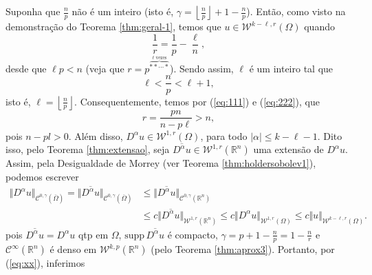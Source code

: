 \documentclass[a4paper, 11pt]{book}
\theoremstyle{definition}
\newcommand{\bR}{\mathbb{R}}
\newcommand{\cC}{\mathcal{C}}
\newcommand{\cW}{\mathcal{W}}
\newcommand{\supp}{\mathrm{supp}\,}
\begin{document}
\begin{prf}
    Suponha que $\frac{n}{p}$ não é um inteiro (isto é, $\gamma = \left\lfloor \frac{n}{p} \right\rfloor + 1 - \frac{n}{p}$). Então, como visto na demonstração do Teorema \ref{thm:geral-1}, temos que $u \in \cW^{k-\ell,r}(\Omega)$ quando
    \begin{equation} \label{eq:111}
        \frac{1}{r} = \frac{1}{p} - \frac{\ell}{n},
    \end{equation}
    desde que $\ell p < n$ (veja que $r = p^{\overbrace{**\cdots*}^{\ell \text{ vezes}}}$). Sendo assim, $\ell$ é um inteiro tal que
    \begin{equation} \label{eq:222}
        \ell < \frac{n}{p} < \ell + 1,
    \end{equation}
    isto é, $\ell = \left\lfloor \frac{n}{p} \right\rfloor$.
    Consequentemente, temos por (\ref{eq:111}) e (\ref{eq:222}), que
    \begin{equation}
        r = \frac{pn}{n-p\ell} > n,
    \end{equation}
    pois $n - pl > 0$. Além disso, $D^\alpha u \in \cW^{1,r}(\Omega)$, para todo $|\alpha| \leqslant k - \ell -1$. Dito isso, pelo Teorema \ref{thm:extensao}, seja $\overline{D^\alpha u} \in \cW^{1,r}(\bR^n)$ uma extensão de $D^\alpha u$.
    Assim, pela Desigualdade de Morrey (ver Teorema \ref{thm:holdersobolev1}), podemos escrever
    \begin{equation} \label{eq:xx}
        \begin{aligned}
            \Vert D^\alpha u \Vert_{\cC^{0,\gamma}(\overline\Omega)} = \Vert \overline{D^\alpha u} \Vert_{\cC^{0,\gamma}(\overline\Omega)} &\leqslant \Vert \overline{D^\alpha u} \Vert_{\cC^{0,\gamma}(\bR^n)} \\
            &\leqslant c \Vert \overline{D^\alpha u} \Vert_{\cW^{1,r}(\bR^n)}\leqslant c \Vert D^\alpha u \Vert_{\cW^{1,r}(\Omega)} \leqslant c \Vert u \Vert_{\cW^{k-\ell,r}(\Omega)}.
        \end{aligned}
    \end{equation}
    pois $\overline{D^\alpha u} = D^\alpha u$ qtp em $\Omega$, $\supp \overline{D^\alpha u}$ é compacto, $\gamma = p + 1 - \frac{n}{p} = 1 - \frac{n}{r}$ e $\cC^\infty(\bR^n)$ é denso em $\cW^{k,p}(\bR^n)$ (pelo Teorema \ref{thm:aprox3}).
    Portanto, por (\ref{eq:xx}), inferimos
    \[
        \begin{aligned}

\end{aligned}\]
\end{prf}
\end{document}

